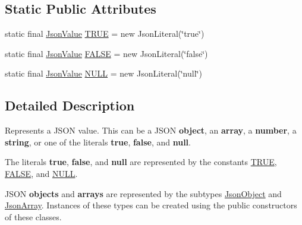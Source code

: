 \subsection*{Static Public Attributes}
\begin{DoxyCompactItemize}
\item 
static final \hyperlink{classcom_1_1ingeniigroup_1_1stratux_1_1_tools_1_1_json_micro_1_1_json_value}{Json\+Value} \hyperlink{classcom_1_1ingeniigroup_1_1stratux_1_1_tools_1_1_json_micro_1_1_json_value_adee76f2b782af0bd340e1b258a47c17e}{T\+R\+UE} = new Json\+Literal(\char`\"{}true\char`\"{})
\item 
static final \hyperlink{classcom_1_1ingeniigroup_1_1stratux_1_1_tools_1_1_json_micro_1_1_json_value}{Json\+Value} \hyperlink{classcom_1_1ingeniigroup_1_1stratux_1_1_tools_1_1_json_micro_1_1_json_value_aa3e443b6a07475f34a66d2dce665d653}{F\+A\+L\+SE} = new Json\+Literal(\char`\"{}false\char`\"{})
\item 
static final \hyperlink{classcom_1_1ingeniigroup_1_1stratux_1_1_tools_1_1_json_micro_1_1_json_value}{Json\+Value} \hyperlink{classcom_1_1ingeniigroup_1_1stratux_1_1_tools_1_1_json_micro_1_1_json_value_ab5a147898d73d0dc88aa11b5c4f1483d}{N\+U\+LL} = new Json\+Literal(\char`\"{}null\char`\"{})
\end{DoxyCompactItemize}


\subsection{Detailed Description}
Represents a J\+S\+ON value. This can be a J\+S\+ON {\bfseries object}, an {\bfseries  array}, a {\bfseries number}, a {\bfseries string}, or one of the literals {\bfseries true}, {\bfseries false}, and {\bfseries null}. 

The literals {\bfseries true}, {\bfseries false}, and {\bfseries null} are represented by the constants \hyperlink{classcom_1_1ingeniigroup_1_1stratux_1_1_tools_1_1_json_micro_1_1_json_value_adee76f2b782af0bd340e1b258a47c17e}{T\+R\+UE}, \hyperlink{classcom_1_1ingeniigroup_1_1stratux_1_1_tools_1_1_json_micro_1_1_json_value_aa3e443b6a07475f34a66d2dce665d653}{F\+A\+L\+SE}, and \hyperlink{classcom_1_1ingeniigroup_1_1stratux_1_1_tools_1_1_json_micro_1_1_json_value_ab5a147898d73d0dc88aa11b5c4f1483d}{N\+U\+LL}. 

J\+S\+ON {\bfseries objects} and {\bfseries arrays} are represented by the subtypes \hyperlink{classcom_1_1ingeniigroup_1_1stratux_1_1_tools_1_1_json_micro_1_1_json_object}{Json\+Object} and \hyperlink{classcom_1_1ingeniigroup_1_1stratux_1_1_tools_1_1_json_micro_1_1_json_array}{Json\+Array}. Instances of these types can be created using the public constructors of these classes. 

